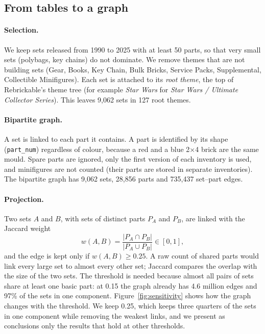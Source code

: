 \documentclass[10pt,a4paper]{article}
\begin{document}
\subsection{From tables to a graph}

\paragraph{Selection.} We keep sets released from 1990 to 2025 with at least
50 parts, so that very small sets (polybags, key chains) do not dominate. We
remove themes that are not building sets (Gear, Books, Key Chain, Bulk Bricks,
Service Packs, Supplemental, Collectible Minifigures). Each set is attached to
its \emph{root theme}, the top of Rebrickable's theme tree (for example
\emph{Star Wars} for \emph{Star Wars / Ultimate Collector Series}). This leaves
9,062 sets in 127 root themes.

\paragraph{Bipartite graph.} A set is linked to each part it contains. A part
is identified by its shape (\texttt{part\_num}) regardless of colour, because a
red and a blue 2$\times$4 brick are the same mould. Spare parts are ignored, only the
first version of each inventory is used, and minifigures are not counted (their
parts are stored in separate inventories). The bipartite graph has 9,062 sets,
28,856 parts and 735,437 set--part edges.

\paragraph{Projection.} Two sets $A$ and $B$, with sets of distinct parts $P_A$
and $P_B$, are linked with the Jaccard weight
\begin{equation}
  w(A,B) = \frac{|P_A \cap P_B|}{|P_A \cup P_B|} \in [0,1],
\end{equation}
and the edge is kept only if $w(A,B) \geq 0.25$. A raw count of shared parts
would link every large set to almost every other set; Jaccard compares the
overlap with the size of the two sets. The threshold is needed because almost
all pairs of sets share at least one basic part: at 0.15 the graph already has
4.6 million edges and 97\% of the sets in one component. Figure~\ref{fig:sensitivity}
shows how the graph changes with the threshold. We keep 0.25, which keeps three
quarters of the sets in one component while removing the weakest links, and we
present as conclusions only the results that hold at other thresholds.
\end{document}
